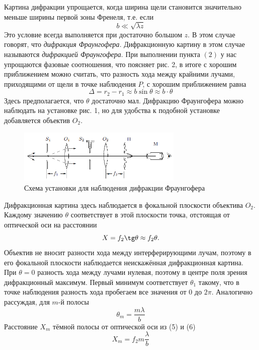 \documentclass[a4paper, 12pt]{article}
\begin{document}
	Картина дифракции упрощается, когда ширина щели становится значительно меньше ширины первой зоны Френеля, т.е. если
	\begin{equation}
	b \ll\sqrt{\lambda z}
	\end{equation}
	Это условие всегда выполняется при достаточно большом $z$. В этом случае говорят, что \textit{дифракция Фраунгофера}. Дифракционную картину в этом случае называются \textit{дифракцией Фраунгофера}. При выполнении пункта $(2)$ у нас упрощаются фазовые соотношения, что поясняет рис. 2, в итоге с хорошим приближением можно считать, что разность хода между крайними лучами, приходящими от щели в точке наблюдения $P$, с хорошим приближением равна
	\begin{equation}
	\Delta = r_2 - r_1 \approx b \sin \theta \approx b \cdot \theta
	\end{equation}
	Здесь предполагается, что $\theta$ достаточно мал.
	Дифракцию Фраунгофера можно наблюдать на установке рис. 1, но для удобства к подобной установке добавляется объектив $O_2$.

	\begin{figure}[h]
		\includegraphics[width = 0.7\textwidth]{431-4.png}
		\centering
		\caption{Схема установки для наблюдения дифракции Фраунгофера}
		\label{Установка_Фраунгофер}
	\end{figure}
	Дифракционная картина здесь наблюдается в фокальной плоскости объектива $O_2$. Каждому значению $\theta$ соответствует в этой плоскости точка, отстоящая от оптической оси на расстоянии
	\begin{equation}
	X = f_2 \tg \theta \approx f_2 \theta.
	\end{equation}
	Объектив не вносит разности хода между интерферирующими лучам, поэтому в его фокальной плоскости наблюдается неискажённая дифракционная картина. При $\theta = 0$ разность хода между лучами нулевая, поэтому в центре поля зрения дифракционный максимум. Первый минимум соответствует $\theta_1$ такому, что в точке наблюдения разность хода пробегаем все значения от 0 до $2\pi$. Аналогично рассуждая, для $m$-й полосы
	\begin{equation}
	\theta_m = \frac{m \lambda}{b}
	\end{equation}
	Расстояние $X_m$ тёмной полосы от оптической оси из (5) и (6)
	\begin{equation}
		\label{Расстояние X_m}
	X_m = f_2m\frac{\lambda}{b}
	\end{equation}
\end{document}
